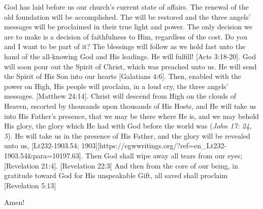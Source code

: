 God has laid before us our church’s current state of affairs. The renewal of the old foundation will be accomplished. The  will be restored and the three angels’ messages will be proclaimed in their true light and power. The only decision we are to make is a decision of faithfulness to Him, regardless of the cost. Do you and I want to be part of it? The blessings will follow as we hold fast unto the hand of the all-knowing God and His leadings.  He will fulfill! [Acts 3:18-20]. God will soon pour out the Spirit of Christ, which was preached unto us. He will send the Spirit of His Son into our hearts [Galatians 4:6].  Then, enabled with the power on High, His people will proclaim, in a loud cry, the three angels’ messages. [Matthew 24:14]. Christ will descend from High on the clouds of Heaven, escorted by thousands upon thousands of His Hosts, and He will take us into His Father’s presence, that we may be there where He is, and we may behold His glory, the glory which He had with God before the world was (\textit{John 17: 24, 5}). He will take us in the presence of His Father, and the glory will be revealed unto us, [Lt232-1903.54; 1903][https://egwwritings.org/?ref=en\_Lt232-1903.54&para=10197.63]. Then God shall wipe away all tears from our eyes; [Revelation 21:4]. [Revelation 22:3] And then from the core of our being, in gratitude toward God for His unspeakable Gift, all saved  shall proclaim [Revelation 5:13]

Amen!

